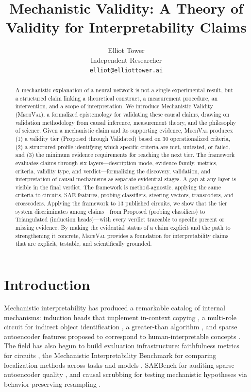 \documentclass[10pt]{article}
\title{Mechanistic Validity: A Theory of Validity for Interpretability Claims}
\author{Elliot Tower\\ Independent Researcher\\ \texttt{elliot@elliottower.ai}}
\newcommand{\mechval}{\textsc{MechVal}}
\begin{document}
\maketitle

\begin{abstract}
A mechanistic explanation of a neural network is not a single experimental result, but a structured claim linking a theoretical construct, a measurement procedure, an intervention, and a scope of interpretation. We introduce Mechanistic Validity (\mechval{}), a formalized epistemology for validating these causal claims, drawing on validation methodology from causal inference, measurement theory, and the philosophy of science. Given a mechanistic claim and its supporting evidence, \mechval{} produces: (1) a validity tier (Proposed through Validated) based on 30 operationalized criteria, (2) a structured profile identifying which specific criteria are met, untested, or failed, and (3) the minimum evidence requirements for reaching the next tier. The framework evaluates claims through six layers---description mode, evidence family, metrics, criteria, validity type, and verdict---formalizing the discovery, validation, and interpretation of causal mechanisms as separate evidential stages. A gap at any layer is visible in the final verdict. The framework is method-agnostic, applying the same criteria to circuits, SAE features, probing classifiers, steering vectors, transcoders, and crosscoders. Applying the framework to 13 published circuits, we show that the tier system discriminates among claims---from Proposed (probing classifiers) to Triangulated (induction heads)---with every verdict traceable to specific present or missing evidence. By making the evidential status of a claim explicit and the path to strengthening it concrete, \mechval{} provides a foundation for interpretability claims that are explicit, testable, and scientifically grounded.
\end{abstract}

\section{Introduction}
\label{sec:intro}

Mechanistic interpretability has produced a remarkable catalog of internal mechanisms:
induction heads that implement in-context copying \citep{olsson2022context}, a multi-role
circuit for indirect object identification \citep{wang2023interpretability}, a greater-than
algorithm \citep{hanna2023greater}, and sparse autoencoder features proposed to correspond
to human-interpretable concepts \citep{cunningham2023sparse, bricken2024monosemanticity}. The field has also begun to
build evaluation infrastructure: faithfulness metrics for circuits
\citep{miller2024transformer}, the Mechanistic Interpretability Benchmark for comparing
localization methods across tasks and models \citep{mueller2025mib}, SAEBench for auditing
sparse autoencoder quality \citep{karvonen2025saebench}, and causal scrubbing for testing
mechanistic hypotheses via behavior-preserving resampling \citep{chan2022causal}.
\end{document}

